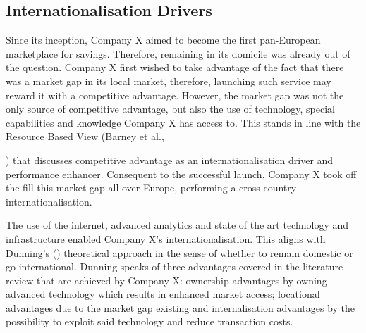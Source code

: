 \documentclass[11pt,a4paper]{article}
\begin{document}
{{\subsection{Internationalisation Drivers}
\vspace{-1mm}
\label{entry_motives}
 \par
Since its inception, Company X aimed to become the first pan-European marketplace for savings. Therefore, remaining in its domicile was already out of the question. Company X first wished to take advantage of the fact that there was a market gap in its local market, therefore, launching such service may reward it with a competitive advantage. However, the market gap was not the only source of competitive advantage, but also the use of technology, special capabilities and knowledge Company X has access to. This stands in line with the Resource Based View (Barney et al., {\citeyear{barneyResourcebasedViewFirm2001}) that discusses competitive advantage as an internationalisation driver and performance enhancer. Consequent to the successful launch, Company X took off the fill this market gap all over Europe, performing a cross-country internationalisation. \par
The use of the internet, advanced analytics and state of the art technology and infrastructure enabled Company X's internationalisation. This aligns with Dunning's (\citeyear{dunningEclecticTheoryInternational1980}) theoretical approach in the sense of whether to remain domestic or go international. Dunning speaks of three advantages covered in the literature review that are achieved by Company X: ownership advantages by owning advanced technology which results in enhanced market access; locational advantages due to the market gap existing and internalisation advantages by the possibility to exploit said technology and reduce transaction costs.  \par

}}}
\end{document}
